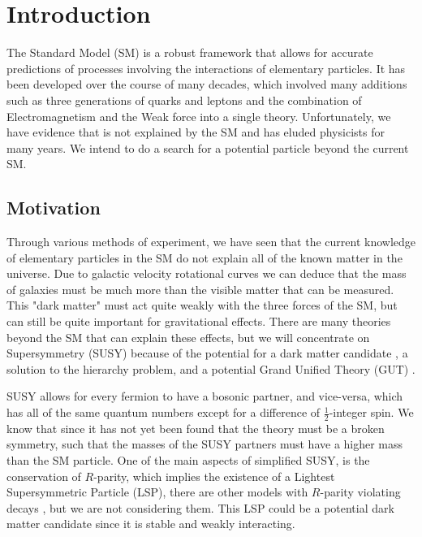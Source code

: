 \chapter{Introduction}
\label{ch:Intro}

The Standard Model (SM) \cite{gaillard_standard_1999} is a robust framework that allows for accurate predictions of processes involving the interactions of elementary particles. It has been developed over the course of many decades, which involved many additions such as three generations of quarks and leptons and the combination of Electromagnetism and the Weak force into a single theory. Unfortunately, we have evidence that is not explained by the SM and has eluded physicists for many years. We intend to do a search for a potential particle beyond the current SM.

\section{Motivation}
\label{sec:Motivation}

Through various methods of experiment, we have seen that the current knowledge of elementary particles in the SM do not explain all of the known matter in the universe. Due to galactic velocity rotational curves we can deduce that the mass of galaxies must be much more than the visible matter that can be measured. This "dark matter" must act quite weakly with the three forces of the SM, but can still be quite important for gravitational effects. There are many theories beyond the SM that can explain these effects, but we will concentrate on Supersymmetry (SUSY) \cite{ramond_dual_1971, volkov_possible_1972, wess_supergauge_1974, fayet_supergauge_1975, barbieri_gauge_1982, chamseddine_locally_1982, hall_supergravity_1983, kane_study_1994, papucci_natural_2012} because of the potential for a dark matter candidate \cite{feng_dark_2010, bertone_dark_2005}, a solution to the hierarchy problem, and a potential Grand Unified Theory (GUT) \cite{georgi_unity_1974, georgi_hierarchy_1974, buras_aspects_1978}.

SUSY allows for every fermion to have a bosonic partner, and vice-versa, which has all of the same quantum numbers except for a difference of $\frac{1}{2}$-integer spin. We know that since it has not yet been found that the theory must be a broken symmetry, such that the masses of the SUSY partners must have a higher mass than the SM particle. One of the main aspects of simplified SUSY, is the conservation of $R$-parity, which implies the existence of a Lightest Supersymmetric Particle (LSP), there are other models with $R$-parity violating decays \cite{barbier_r-parity-violating_2005, grossman_sneutrino_1999}, but we are not considering them. This LSP could be a potential dark matter candidate since it is stable and weakly interacting. 


